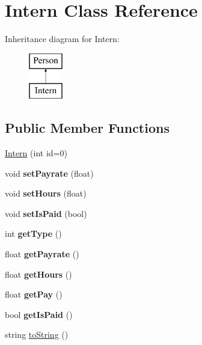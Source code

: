 \hypertarget{class_intern}{\section{Intern Class Reference}
\label{class_intern}
}
Inheritance diagram for Intern\+:\begin{figure}[H]
\begin{center}
\leavevmode
\includegraphics[height=2.000000cm]{class_intern}
\end{center}
\end{figure}
\subsection*{Public Member Functions}
\begin{DoxyCompactItemize}
\item 
\hyperlink{class_intern_adbbfa5e0b5451fb83cd6000e238cbb44}{Intern} (int id=0)
\item 
\hypertarget{class_intern_a04aa681b24ee4ead502a30ad5f2724ad}{void {\bfseries set\+Payrate} (float)}\label{class_intern_a04aa681b24ee4ead502a30ad5f2724ad}

\item 
\hypertarget{class_intern_af783dd0abf31cbb3a57ddb46f6949d54}{void {\bfseries set\+Hours} (float)}\label{class_intern_af783dd0abf31cbb3a57ddb46f6949d54}

\item 
\hypertarget{class_intern_a701018c40635e899355345837b52dee4}{void {\bfseries set\+Is\+Paid} (bool)}\label{class_intern_a701018c40635e899355345837b52dee4}

\item 
\hypertarget{class_intern_af03421c6a2f6e24c4d2429a024cf9df7}{int {\bfseries get\+Type} ()}\label{class_intern_af03421c6a2f6e24c4d2429a024cf9df7}

\item 
\hypertarget{class_intern_a96c0406cc62b6bcbf8373831ea301377}{float {\bfseries get\+Payrate} ()}\label{class_intern_a96c0406cc62b6bcbf8373831ea301377}

\item 
\hypertarget{class_intern_a351faa84f1976a746fee681fce052be7}{float {\bfseries get\+Hours} ()}\label{class_intern_a351faa84f1976a746fee681fce052be7}

\item 
\hypertarget{class_intern_abe81a82954001ff5c52c16da91ae4285}{float {\bfseries get\+Pay} ()}\label{class_intern_abe81a82954001ff5c52c16da91ae4285}

\item 
\hypertarget{class_intern_af4df739723466bc6ab2bb56f008a7fdc}{bool {\bfseries get\+Is\+Paid} ()}\label{class_intern_af4df739723466bc6ab2bb56f008a7fdc}

\item 
string \hyperlink{class_intern_a93797b17f810c7400303f63d9e49fc9a}{to\+String} ()
\end{DoxyCompactItemize}
